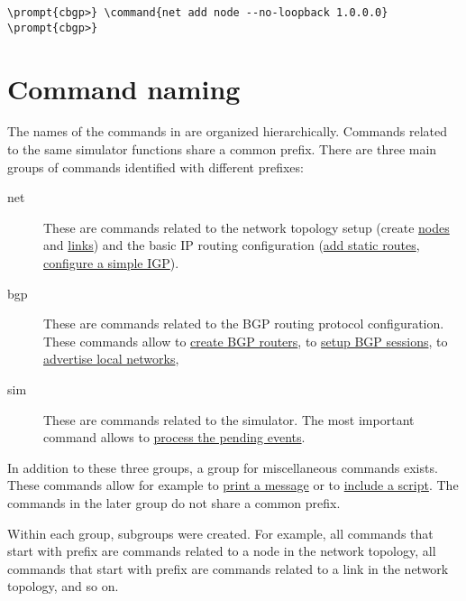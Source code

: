 \begin{Verbatim}[commandchars=\\\{\}]
\prompt{cbgp>} \command{net add node --no-loopback 1.0.0.0}
\prompt{cbgp>}
\end{Verbatim}


\section{Command naming}
\label{sec:user-interface-commands}

The names of the commands in  are organized
hierarchically. Commands related to the same simulator functions share
a common prefix. There are three main groups of commands identified
with different prefixes:

\begin{description}
\item [net]
  These are commands related to the network topology setup
  (create \hyperref[cmd:net_add_node]{nodes} and
  \hyperref[cmd:net_add_link]{links}) and the basic IP routing
  configuration (\hyperref[cmd:net_node_route_add]{add static routes},
  \hyperref[cmd:net_add_domain]{configure a simple IGP}).

\item [bgp]
  These are commands related to the BGP routing protocol
  configuration. These commands allow to
  \hyperref[cmd:bgp_add_router]{create BGP routers}, to
  \hyperref[cmd:bgp_router_add_peer]{setup BGP sessions},  to
  \hyperref[cmd:bgp_router_add_network]{advertise local networks}, 

\item [sim]
  These are commands related to the simulator. The most important
  command allows to \hyperref[cmd:sim_run]{process the pending
    events}.

\end{description}

In addition to these three groups, a group for miscellaneous commands
exists. These commands allow for example to \hyperref[cmd:print]{print
  a message} or to \hyperref[cmd:include]{include a script}. The
commands in the later group do not share a common prefix.

Within each group, subgroups were created. For example, all commands
that start with prefix  are commands related to a
node in the network topology, all commands that start with prefix
 are commands related to a link in the network
topology, and so on.

